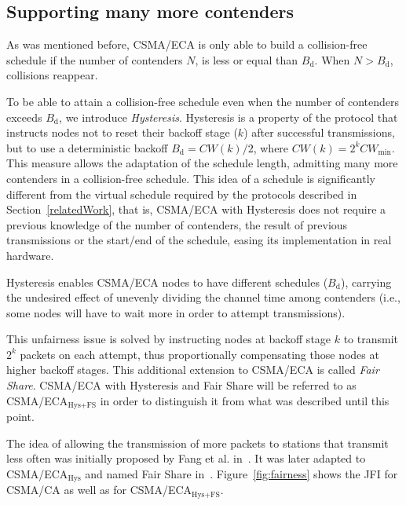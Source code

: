 	\subsection{Supporting many more contenders}\label{moreContenders}
	As was mentioned before, CSMA/ECA is only able to build a collision-free schedule if the number of contenders $N$, is less or equal than $B_{\text{d}}$. When $N > B_{\text{d}}$, collisions reappear. 
	
	To be able to attain a collision-free schedule even when the number of contenders exceeds $B_{\text{d}}$, we introduce \emph{Hysteresis}. Hysteresis is a property of the protocol that instructs nodes not to reset their backoff stage ($k$) after successful transmissions, but to use a deterministic backoff $B_{\text{d}}=CW(k)/2$, where $CW(k)=2^{k}CW_{\min}$. This measure allows the adaptation of the schedule length, admitting many more contenders in a collision-free schedule. This idea of a schedule is significantly different from the virtual schedule required by the protocols described in Section~\ref{relatedWork}, that is, CSMA/ECA with Hysteresis does not require a previous knowledge of the number of contenders, the result of previous transmissions or the start/end of the schedule, easing its implementation in real hardware.
	
	Hysteresis enables CSMA/ECA nodes to have different schedules ($B_{\text{d}}$), carrying the undesired effect of unevenly dividing the channel time among contenders (i.e., some nodes will have to wait more in order to attempt transmissions).
	
	This unfairness issue is solved by instructing nodes at backoff stage $k$ to transmit $2^{k}$ packets on each attempt, thus proportionally compensating those nodes at higher backoff stages. This additional extension to CSMA/ECA is called \emph{Fair Share}. CSMA/ECA with Hysteresis and Fair Share will be referred to as CSMA/ECA$_{\text{Hys+FS}}$ in order to distinguish it from what was described until this point.
	
	The idea of allowing the transmission of more packets to stations that transmit less often was initially proposed by Fang et al. in~\cite{L_MAC}. It was later adapted to CSMA/ECA$_{\text{Hys}}$ and named Fair Share in~\cite{research2standards}. Figure~\ref{fig:fairness} shows the JFI for CSMA/CA as well as for CSMA/ECA$_{\text{Hys+FS}}$.
	
